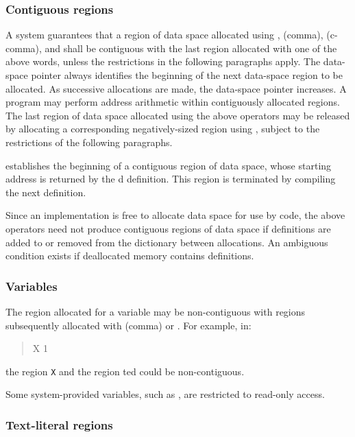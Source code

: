 \subsubsection{Contiguous regions} %
\label{usage:contiguous}

A system guarantees that a region of data space allocated using
, \word{,} (comma),  (c-comma), and
 shall be contiguous with the last region allocated
with one of the above words, unless the restrictions in the
following paragraphs apply. The data-space pointer 
always identifies the beginning of the next data-space region to be
allocated. As successive allocations are made, the data-space
pointer increases. A program may perform address arithmetic within
contiguously allocated regions. The last region of data space
allocated using the above operators may be released by allocating a
corresponding negatively-sized region using , subject
to the restrictions of the following paragraphs.

 establishes the beginning of a contiguous region of
data space, whose starting address is returned by the d
definition. This region is terminated by compiling the next
definition.

Since an implementation is free to allocate data space for use by
code, the above operators need not produce contiguous regions of
data space if definitions are added to or removed from the
dictionary between allocations. An ambiguous condition exists if
deallocated memory contains definitions.


\subsubsection{Variables} %
\label{usage:var}

The region allocated for a variable may be non-contiguous with
regions subsequently allocated with \word{,} (comma) or
. For example, in:
\begin{quote}
	 X 1  
\end{quote}
the region \texttt{X} and the region ted could be
non-contiguous.

Some system-provided variables, such as , are
restricted to read-only access.


\subsubsection{Text-literal regions} %
\label{usage:"literal}

